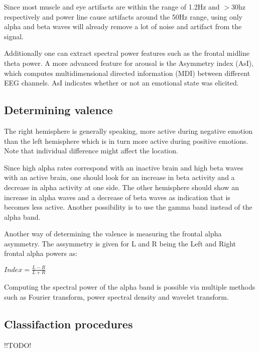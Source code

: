 \npar

Since most muscle and eye artifacts are within the range of 1.2Hz and $>$30hz respectively and power line cause artifacts around the 50Hz range, using only alpha and beta waves will already remove a lot of noise and artifact from the signal\cite{ExtendedPaper}.

\npar

Additionally one can extract spectral power features such as the frontal midline theta power. 
A more advanced feature for arousal is the Asymmetry index (AsI), which computes multidimensional directed information (MDI) between different EEG channels\cite{GivenPaper}. AsI indicates whether or not an emotional state was elicited. 

\npar 

\subsection{Determining valence}
The right hemisphere is generally speaking, more active during negative emotion than the left hemisphere which is in turn more active during positive emotions\cite{RealTimeEEGEmotion}\cite{EEGDatasets}. Note that individual difference might affect the location\cite{ExtendedPaper}.

\npar

Since high alpha rates correspond with an inactive brain and high beta waves with an active brain, one should look for an increase in beta activity and a decrease in alpha activity at one side. The other hemisphere should show an increase in alpha waves and a decrease of beta waves as indication that is becomes less active. Another possibility is to use the gamma band instead of the alpha band. 

\npar

Another way of determining the valence is measuring the frontal alpha asymmetry\cite{GivenPaper}. The assymmetry is given for L and R being the Left and Right frontal alpha powers as:\\
\begin{center}
$Index = \frac{L-R}{L+R}$
\end{center}
Computing the spectral power of the alpha band is possible via multiple methods such as Fourier transform, power spectral density and wavelet transform.

\subsection{Classifaction procedures}
!!TODO!

